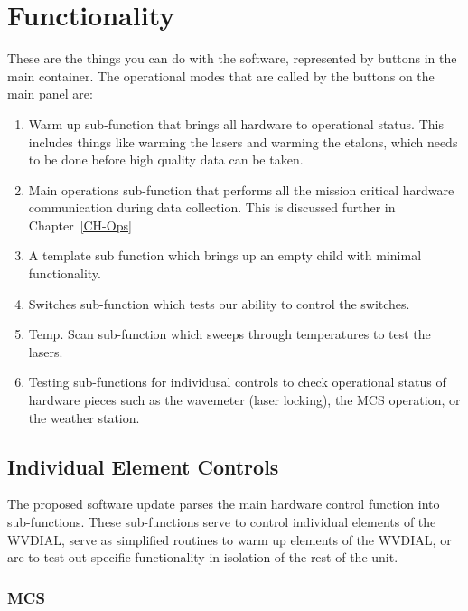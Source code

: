 
\chapter{Functionality}
\label{CH-Functions}

These are the things you can do with the software, represented by buttons in the main container. The operational modes that are called by the buttons on the main panel are:

\begin{enumerate}
\item{Warm up sub-function that brings all hardware to operational status. This includes things like warming the lasers and warming the etalons, which needs to be done before high quality data can be taken.}
\item{Main operations sub-function that performs all the mission critical hardware communication during data collection. This is discussed further in Chapter~\ref{CH-Ops}}
\item{A template sub function which brings up an empty child with minimal functionality.}
\item{Switches sub-function which tests our ability to control the switches.}
\item{Temp. Scan sub-function which sweeps through temperatures to test the lasers.}
\item{Testing sub-functions for individusal controls to check operational status of hardware pieces such as the wavemeter (laser locking), the MCS operation, or the weather station.}
\end{enumerate}

\section{Individual Element Controls}
The proposed software update parses the main hardware control function into sub-functions. These sub-functions serve to control individual elements of the WVDIAL, serve as simplified routines to warm up elements of the WVDIAL, or are to test out specific functionality in isolation of the rest of the unit. 

\subsection{MCS}\label{Sec:MCSSubFunction}

